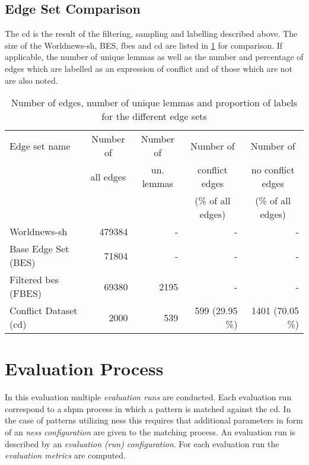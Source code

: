 \documentclass[11pt]{scrreprt}
\begin{document}
{%

\subsection{Edge Set Comparison}
The \gls{cd} is the result of the filtering, sampling and labelling described above. The size of the Worldnews-\gls{sh}, BES, \gls{fbes} and \gls{cd} are listed in \cref{tab:dataset-descriptions} for comparison. If applicable, the number of unique lemmas as well as the number and percentage of edges which are labelled as an expression of conflict and of those which are not are also noted.


\begin{table}
\centering
\begin{tabular}{lrrrr}
\toprule
\multicolumn{1}{l}{Edge set name}	& \multicolumn{1}{c}{Number of} & \multicolumn{1}{c}{Number of}		& \multicolumn{1}{c}{Number of} 		& \multicolumn{1}{c}{Number of} \\
\multicolumn{1}{l}{} 				& \multicolumn{1}{c}{all edges} & \multicolumn{1}{c}{un. lemmas}			& \multicolumn{1}{c}{conflict edges} 	& \multicolumn{1}{c}{no conflict edges} \\
\multicolumn{1}{l}{} 				& \multicolumn{1}{c}{} 			& \multicolumn{1}{c}{}				& \multicolumn{1}{c}{(\% of all edges)} & \multicolumn{1}{c}{(\% of all edges)} \\
\midrule
Worldnews-\gls{sh}						& 479384		& -			& -					& - \\
Base Edge Set (BES)					& 71804		& -			& -					& - \\
Filtered \gls{bes} (FBES)					& 69380 		& 2195 		& - 					& - \\
Conflict Dataset (\gls{cd})				& 2000 		& 539 		& 599 (29.95 \%) 	& 1401 (70.05 \%) \\
\bottomrule
\end{tabular}
\caption{Number of edges, number of unique lemmas and proportion of labels for the different edge sets}
\label{tab:dataset-descriptions}
\end{table}


\section{Evaluation Process}
In this evaluation multiple \textit{evaluation runs} are conducted. Each evaluation run correspond to a \gls{shpm} process in which a pattern is matched against the \gls{cd}. In the case of patterns utilizing \gls{ness} this requires that additional parameters in form of an \textit{\gls{ness} configuration} are given to the matching process. An evaluation run is described by an \textit{evaluation (run) configuration}. For each evaluation run the \textit{evaluation metrics} are computed. 

}
\end{document}
